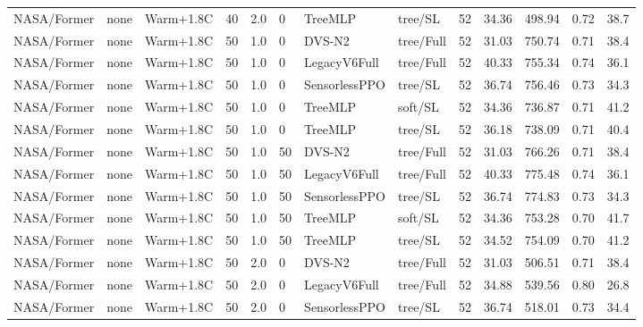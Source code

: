 \documentclass[10pt,a4paper]{article}
\begin{document}
\begin{landscape}
\begin{longtable}{llllllllrrrrr}
NASA/Former & none & Warm+1.8C & 40 & 2.0 & 0 & TreeMLP & tree/SL & 52 & 34.36 & 498.94 & 0.72 & 38.7 \\

NASA/Former & none & Warm+1.8C & 50 & 1.0 & 0 & DVS-N2 & tree/Full & 52 & 31.03 & 750.74 & 0.71 & 38.4 \\

NASA/Former & none & Warm+1.8C & 50 & 1.0 & 0 & LegacyV6Full & tree/Full & 52 & 40.33 & 755.34 & 0.74 & 36.1 \\

NASA/Former & none & Warm+1.8C & 50 & 1.0 & 0 & SensorlessPPO & tree/SL & 52 & 36.74 & 756.46 & 0.73 & 34.3 \\

NASA/Former & none & Warm+1.8C & 50 & 1.0 & 0 & TreeMLP & soft/SL & 52 & 34.36 & 736.87 & 0.71 & 41.2 \\

NASA/Former & none & Warm+1.8C & 50 & 1.0 & 0 & TreeMLP & tree/SL & 52 & 36.18 & 738.09 & 0.71 & 40.4 \\

NASA/Former & none & Warm+1.8C & 50 & 1.0 & 50 & DVS-N2 & tree/Full & 52 & 31.03 & 766.26 & 0.71 & 38.4 \\

NASA/Former & none & Warm+1.8C & 50 & 1.0 & 50 & LegacyV6Full & tree/Full & 52 & 40.33 & 775.48 & 0.74 & 36.1 \\

NASA/Former & none & Warm+1.8C & 50 & 1.0 & 50 & SensorlessPPO & tree/SL & 52 & 36.74 & 774.83 & 0.73 & 34.3 \\

NASA/Former & none & Warm+1.8C & 50 & 1.0 & 50 & TreeMLP & soft/SL & 52 & 34.36 & 753.28 & 0.70 & 41.7 \\

NASA/Former & none & Warm+1.8C & 50 & 1.0 & 50 & TreeMLP & tree/SL & 52 & 34.52 & 754.09 & 0.70 & 41.2 \\

NASA/Former & none & Warm+1.8C & 50 & 2.0 & 0 & DVS-N2 & tree/Full & 52 & 31.03 & 506.51 & 0.71 & 38.4 \\

NASA/Former & none & Warm+1.8C & 50 & 2.0 & 0 & LegacyV6Full & tree/Full & 52 & 34.88 & 539.56 & 0.80 & 26.8 \\

NASA/Former & none & Warm+1.8C & 50 & 2.0 & 0 & SensorlessPPO & tree/SL & 52 & 36.74 & 518.01 & 0.73 & 34.4 \\


\end{longtable}
\end{landscape}
\end{document}
